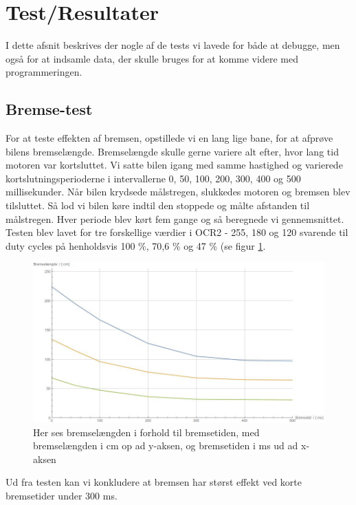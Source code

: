 \section{Test/Resultater}

I dette afsnit beskrives der nogle af de tests vi lavede for både at debugge, men også for at indsamle data, der skulle bruges for at komme videre med programmeringen.

\subsection{Bremse-test}

For at teste effekten af bremsen, opstillede vi en lang lige bane, for at afprøve bilens bremselængde. Bremselængde skulle gerne variere alt efter, hvor lang tid motoren var kortsluttet. Vi satte bilen igang med samme hastighed og varierede kortslutningsperioderne i intervallerne 0, 50, 100, 200, 300, 400 og 500 millisekunder. Når bilen krydsede målstregen, slukkedes motoren og bremsen blev tilsluttet. Så lod vi bilen køre indtil den stoppede og målte afstanden til målstregen. Hver periode blev kørt fem gange og så beregnede vi gennemsnittet. Testen blev lavet for tre forskellige værdier i OCR2 - 255, 180 og 120 svarende til duty cycles på henholdsvis 100 \%, 70,6 \% og 47 \% (se figur \ref{fig:Bremselir}. 

\begin{figure}[h]

	\centering
		\includegraphics[scale=0.4]{Billeder/Bremse.jpeg}
	\caption{Her ses bremselængden i forhold til bremsetiden, med bremselængden i cm op ad y-aksen, og bremsetiden i ms ud ad x-aksen}
	\label{fig:Bremselir}
	
\end{figure}

Ud fra testen kan vi konkludere at bremsen har størst effekt ved korte bremsetider under 300 ms.

